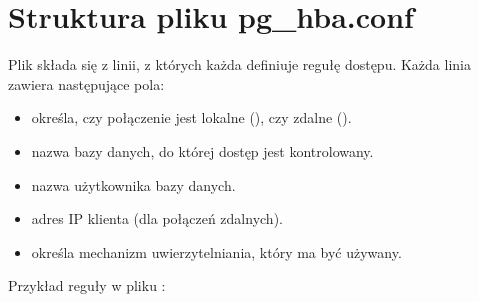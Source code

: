 \documentclass[letterpaper,10pt,polish]{sphinxmanual}
\begin{document}
\section{Struktura pliku pg\_hba.conf}
\label{\detokenize{sprawozdanie/source/rozdzialy/rozdzial1:struktura-pliku-pg-hba-conf}}
\sphinxAtStartPar
Plik  składa się z linii, z których każda definiuje
regułę dostępu. Każda linia zawiera następujące pola:
\begin{itemize}
\item {} 
\sphinxAtStartPar
{} \sphinxhyphen{} określa, czy połączenie jest lokalne
(), czy zdalne ().

\item {} 
\sphinxAtStartPar
{} \sphinxhyphen{} nazwa bazy danych, do której dostęp jest
kontrolowany.

\item {} 
\sphinxAtStartPar
{} \sphinxhyphen{} nazwa użytkownika bazy danych.

\item {} 
\sphinxAtStartPar
{} \sphinxhyphen{} adres IP klienta (dla połączeń zdalnych).

\item {} 
\sphinxAtStartPar
{} \sphinxhyphen{} określa mechanizm uwierzytelniania,
który ma być używany.

\end{itemize}

\sphinxAtStartPar
Przykład reguły w pliku :

\begin{sphinxVerbatim}[commandchars=\\\{\}]
                                 
\end{sphinxVerbatim}
\end{document}
